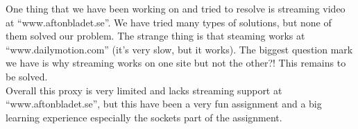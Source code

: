 \documentclass{mall}
\begin{document}
One thing that we have been working on and tried to resolve is streaming video at ``www.aftonbladet.se''. We have tried many types of solutions, but none of them solved our problem. The strange thing is that steaming works at ``www.dailymotion.com'' (it's very slow, but it works). The biggest question mark we have is why streaming works on one site but not the other?! This remains to be solved.\\

Overall this proxy is very limited and lacks streaming support at ``www.aftonbladet.se'', but this have been a very fun assignment and a big learning experience especially the sockets part of the assignment.
\end{document}
